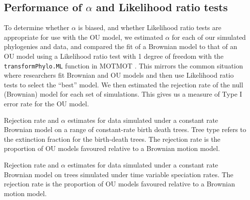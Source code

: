 \documentclass[a4paper,12pt]{article}
\begin{document}
  \subsection{Performance of $\alpha$ and Likelihood ratio tests}
    To determine whether $\alpha$ is biased, and whether Likelihood ratio tests are appropriate for use with the OU model, we estimated $\alpha$ for each of our simulated phylogenies and data, and compared the fit of a Brownian model to that of an OU model using a Likelihood ratio test with 1 degree of freedom with the \texttt{transformPhylo.ML} function in MOTMOT \citep{Thomas:2011aa}. 
    This mirrors the common situation where researchers fit Brownian and OU models and then use Likelihood ratio tests to select the ``best'' model.
    We then estimated the rejection rate of the null (Brownian) model for each set of simulations. 
    This gives us a measure of Type I error rate for the OU model.

      \begin{table}[!htbp]
        \begin{center}
        \caption{Rejection rate and $\alpha$ estimates for data simulated under a constant rate Brownian model on a range of constant-rate birth death trees. Tree type refers to the extinction fraction for the birth-death trees. The rejection rate is the proportion of OU models favoured relative to a Brownian motion model.}
        \bigskip
        
        \label{tables:bd_noerror}
        \end{center}
\end{table} 

      \begin{table}[!htbp]
        \begin{center}
        \caption{Rejection rate and $\alpha$ estimates for data simulated under a constant rate Brownian model on trees simulated under time variable speciation rates. The rejection rate is the proportion of OU models favoured relative to a Brownian motion model.}
        \bigskip
        
        \label{tables:varrate_noerror}
        \end{center}
\end{table} 
\end{document}
